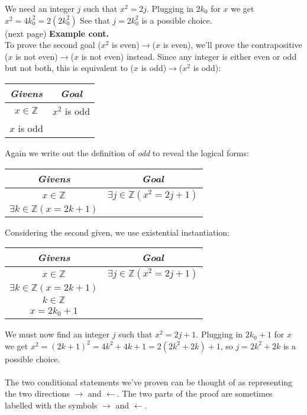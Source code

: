 \documentclass{report}
\theoremstyle{definition}
\begin{document}
We need an integer $j$ such that $x^2=2j$. Plugging in $2k_0$ for $x$ we get $x^2=4k^2_0=2(2k^2_0)$
See that $j=2k_0^2$ is a possible choice.\\
(next page)\newpage
\noindent\textbf{Example cont.}\\
To prove the second goal ($x^2$ is even)$\to$($x$ is even), we'll prove the contrapositive ($x$ is not even)$\to$($x$ is not even) instead. Since any integer
is either even or odd but not both, this is equivalent to ($x$ is odd)$\to$($x^2$ is odd):
\begin{center}
\begin{tabular}{c|c}
\textit{Givens}&\textit{Goal}\\
\hline
$x\in\mathbb Z$&$x^2$ is odd\\
$x$ is odd&\\
\end{tabular}
\end{center}
Again we write out the definition of \textit{odd} to reveal the logical forms:
\begin{center}
\begin{tabular}{c|c}
\textit{Givens}&\textit{Goal}\\
\hline
$x\in\mathbb Z$&$\exists j\in\mathbb Z(x^2=2j+1)$\\
$\exists k\in\mathbb Z(x=2k+1)$\\
\end{tabular}
\end{center}
Considering the second given, we use existential instantiation:
\begin{center}
\begin{tabular}{c|c}
\textit{Givens}&\textit{Goal}\\
\hline
$x\in\mathbb Z$&$\exists j\in\mathbb Z(x^2=2j+1)$\\
$\exists k\in\mathbb Z(x=2k+1)$&\\
$k\in\mathbb Z$&\\
$x=2k_0+1$&
\end{tabular}
\end{center}
We must now find an integer $j$ such that $x^2=2j+1$. Plugging in $2k_0+1$ for $x$ we get 
$x^2=(2k+1)^2=4k^2+4k+1=2(2k^2+2k)+1$, so $j=2k^2+2k$ is a possible choice.\\
\vspace{1mm}\\
The two conditional statements we've proven can be thought of as representing the two directions $\to$ and $\leftarrow$. The two parts of the proof are sometimes labelled with the symbols
$\to$ and $\leftarrow$.\\
\end{document}
